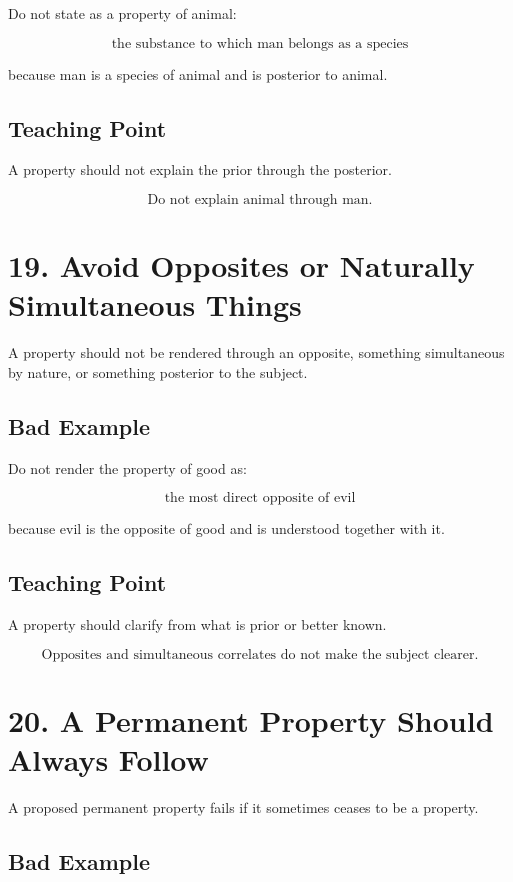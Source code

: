 \documentclass[12pt]{article}
\begin{document}
Do not state as a property of animal:

\[
\text{the substance to which man belongs as a species}
\]

because man is a species of animal and is posterior to animal.

\subsection*{Teaching Point}

A property should not explain the prior through the posterior.

\[
\boxed{
\text{Do not explain animal through man.}
}
\]

\section*{19. Avoid Opposites or Naturally Simultaneous Things}

A property should not be rendered through an opposite, something simultaneous by
nature, or something posterior to the subject.

\subsection*{Bad Example}

Do not render the property of good as:

\[
\text{the most direct opposite of evil}
\]

because evil is the opposite of good and is understood together with it.

\subsection*{Teaching Point}

A property should clarify from what is prior or better known.

\[
\boxed{
\text{Opposites and simultaneous correlates do not make the subject clearer.}
}
\]

\section*{20. A Permanent Property Should Always Follow}

A proposed permanent property fails if it sometimes ceases to be a property.

\subsection*{Bad Example}
\end{document}
